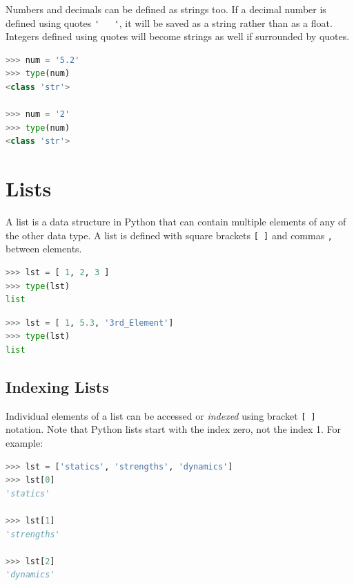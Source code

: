 \documentclass{book}
\begin{document}
Numbers and decimals can be defined as strings too. If a decimal number
is defined using quotes \lstinline!'   '!, it will be saved as a string
rather than as a float. Integers defined using quotes will become
strings as well if surrounded by quotes.

\begin{lstlisting}[language=Python]
>>> num = '5.2'
>>> type(num)
<class 'str'>

>>> num = '2'
>>> type(num)
<class 'str'>
\end{lstlisting}
    




    
        \section{Lists}\label{lists}
    




    
        A list is a data structure in Python that can contain multiple elements
of any of the other data type. A list is defined with square brackets
\lstinline![ ]! and commas \lstinline!,! between elements.

\begin{lstlisting}[language=Python]
>>> lst = [ 1, 2, 3 ]
>>> type(lst)
list
\end{lstlisting}

\begin{lstlisting}[language=Python]
>>> lst = [ 1, 5.3, '3rd_Element']
>>> type(lst)
list
\end{lstlisting}
    




    
        \subsection{Indexing Lists}\label{indexing-lists}

Individual elements of a list can be accessed or \emph{indexed} using
bracket \lstinline![ ]! notation. Note that Python lists start with the
index zero, not the index 1. For example:

\begin{lstlisting}[language=Python]
>>> lst = ['statics', 'strengths', 'dynamics']
>>> lst[0]
'statics'

>>> lst[1]
'strengths'

>>> lst[2]
'dynamics'
\end{lstlisting}
\end{document}
